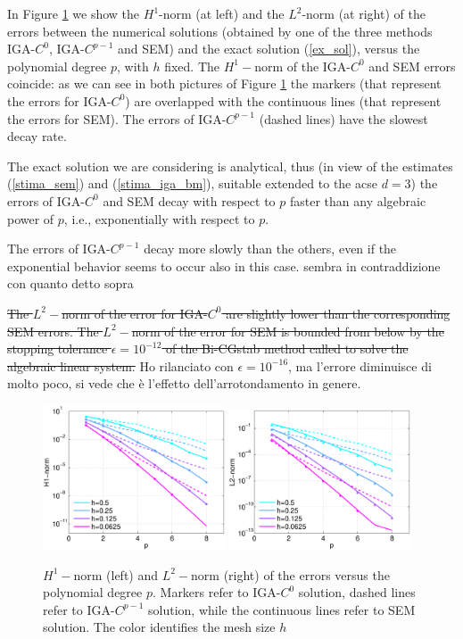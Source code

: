 \documentclass[11pt]{article}
\newcommand{\pg}{\color{red}}
\newcommand{\pgc}[1]{\color{blue}\sout{#1}}
\newcommand{\aq}{\color{blue}}
\begin{document}
In Figure \ref{fig:errori_H1L2_p} we show the $H^1$-norm (at left) and the 
$L^2$-norm (at right) of the errors between the 
numerical solutions (obtained by one of the three methods IGA-$C^0$,
IGA-$C^{p-1}$ and SEM)
and the exact solution (\ref{ex_sol}), versus the polynomial degree $p$,
with $h$ fixed. The $H^1-$norm of the
IGA-$C^0$ and SEM  errors coincide: as we can see in both pictures of
Figure \ref{fig:errori_H1L2_p} the markers 
(that represent the errors for IGA-$C^0$) are overlapped with the 
continuous lines (that represent the errors for SEM).
The errors of IGA-$C^{p-1}$ (dashed lines) 
have the slowest decay rate.

The exact solution we are considering is analytical, thus (in view of the 
estimates (\ref{stima_sem}) and (\ref{stima_iga_bm}), {\pg suitable extended to 
the acse $d=3$})
the errors of IGA-$C^0$ and SEM decay with respect to $p$ 
faster than any algebraic power of $p$, i.e., exponentially with respect to $p$.

The errors of IGA-$C^{p-1}$ decay more slowly than the others, even if 
the exponential behavior seems to occur also in this case.
{\aq sembra in contraddizione con quanto detto sopra}

{\pgc{The $L^2-$norm of the error for IGA-$C^0$ are slightly lower than the 
corresponding SEM errors.
The $L^2-$norm of the error for SEM is bounded from below by the 
stopping tolerance $\epsilon=10^{-12}$ of the Bi-CGstab method called to solve
the algebraic linear system. }}
{\pg Ho rilanciato con $\epsilon=10^{-16}$, ma l'errore diminuisce 
di molto poco, si vede che \`e l'effetto dell'arrotondamento in genere.}


\begin{figure}
\includegraphics[width=0.48\textwidth]{Images/errH1_3d_p.eps}
\includegraphics[width=0.48\textwidth]{Images/errL2_3d_p.eps}\\
\caption{$H^1-$norm   (left) and $L^2-$norm (right) of the errors versus 
the polynomial degree $p$. Markers refer to IGA-$C^0$ solution, 
dashed lines refer to IGA-$C^{p-1}$ solution, while the continuous lines 
refer to SEM solution. The color identifies the mesh size $h$}
\label{fig:errori_H1L2_p}
\end{figure}
\end{document}
